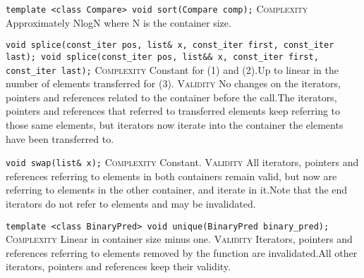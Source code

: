 \noindent{}\hspace*{0.25em}\lstinline[basicstyle=\ttfamily\color{cred}]{template <class Compare> void sort(Compare comp);} \textsc{Complexity} Approximately NlogN where N is the container size.\\\vspace{-0.6em}

\noindent{}\hspace*{0.25em}\lstinline[basicstyle=\ttfamily\color{corange}]{void splice(const_iter pos, list& x, const_iter first, const_iter last); void splice(const_iter pos, list&& x, const_iter first, const_iter last);} \textsc{Complexity} Constant for (1) and (2).Up to linear in the number of elements transferred for (3). \textsc{Validity} No changes on the iterators, pointers and references related to the container before the call.The iterators, pointers and references that referred to transferred elements keep referring to those same elements, but iterators now iterate into the container the elements have been transferred to.\\\vspace{-0.6em}

\noindent{}\hspace*{0.25em}\lstinline[basicstyle=\ttfamily\color{cgreen}]{void swap(list& x);} \textsc{Complexity} Constant. \textsc{Validity} All iterators, pointers and references referring to elements in both containers remain valid, but now are referring to elements in the other container, and iterate in it.Note that the end iterators do not refer to elements and may be invalidated.\\\vspace{-0.6em}

\noindent{}\hspace*{0.25em}\lstinline[basicstyle=\ttfamily\color{corange}]{template <class BinaryPred> void unique(BinaryPred binary_pred);} \textsc{Complexity} Linear in container size minus one. \textsc{Validity} Iterators, pointers and references referring to elements removed by the function are invalidated.All other iterators, pointers and references keep their validity.\\\vspace{-0.6em}


